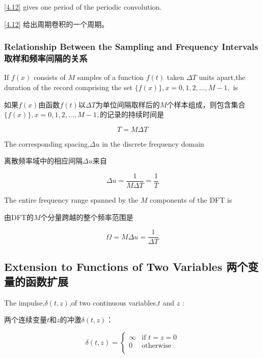 \documentclass[12pt]{article}
\numberwithin{equation}{section}%
\begin{document}
\ref{4.12} gives one period of the periodic convolution.

\ref{4.12} 给出周期卷积的一个周期。

\subsubsection{Relationship Between the Sampling and Frequency Intervals 取样和频率间隔的关系}

If $f(x)$ consists of $M$ samples of a function $f(t)$ taken $ \Delta  T$ units apart,the duration of the record comprising the set  $\{f(x)\},x=0,1,2,\ldots ,M-1, $ is 

如果$f(x)$由函数$f(t)$以$ \Delta  T$为单位间隔取样后的$M$个样本组成，则包含集合$\{f(x)\},x=0,1,2,\ldots ,M-1, $的记录的持续时间是

\begin{equation} \label{4.13}
T=M\Delta T
\end{equation}


The corresponding spacing,$\Delta u$ in the discrete frequency domain

离散频率域中的相应间隔$\Delta u$来自

\begin{equation} \label{4.14}
\Delta u=\frac{1}{M\Delta T}=\frac{1}{T}
\end{equation}
 
The entire frequency range spanned by the $M$ components of the DFT is

由DFT的$M$个分量跨越的整个频率范围是

\begin{equation} \label{4.15}
\Omega =M\Delta u=\frac{1}{\Delta T}
\end{equation}

\subsection{Extension to Functions of Two Variables 两个变量的函数扩展}

The impulse,$\delta(t,z)$,of two continuous variables,$t$ and $z$ :

两个连续变量$t$和$z$的冲激$\delta(t,z)$：

\begin{equation} \label{4.16}
\delta(t,z) = \left\{ \begin{array}{ll}
\infty & \textrm{if $t=z=0$}\\
0 & \textrm{otherwise}\\
\end{array} \right.
\end{equation}
\end{document}
